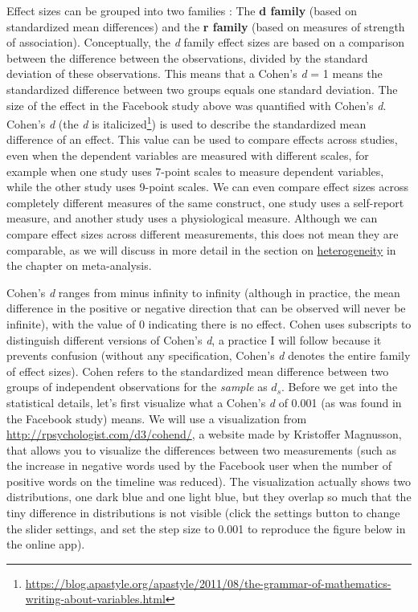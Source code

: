 \documentclass[
  oneside]{krantz}
\renewcommand{\href}[2]{#2\footnote{\url{#1}}}
\begin{document}
Effect sizes can be grouped into two families \citep{rosenthal_contrasts_2000}: The \textbf{d family} (based on standardized mean differences) and the \textbf{r family} (based on measures of strength of association). Conceptually, the \emph{d} family effect sizes are based on a comparison between the difference between the observations, divided by the standard deviation of these observations. This means that a Cohen's \emph{d} = 1 means the standardized difference between two groups equals one standard deviation. The size of the effect in the Facebook study above was quantified with Cohen's \emph{d}. Cohen's \emph{d} (the \emph{d} is \href{https://blog.apastyle.org/apastyle/2011/08/the-grammar-of-mathematics-writing-about-variables.html}{italicized}) is used to describe the standardized mean difference of an effect. This value can be used to compare effects across studies, even when the dependent variables are measured with different scales, for example when one study uses 7-point scales to measure dependent variables, while the other study uses 9-point scales. We can even compare effect sizes across completely different measures of the same construct, one study uses a self-report measure, and another study uses a physiological measure. Although we can compare effect sizes across different measurements, this does not mean they are comparable, as we will discuss in more detail in the section on \protect\hyperlink{heterogeneity}{heterogeneity} in the chapter on meta-analysis.

Cohen's \emph{d} ranges from minus infinity to infinity (although in practice, the mean difference in the positive or negative direction that can be observed will never be infinite), with the value of 0 indicating there is no effect. Cohen \citeyearpar{cohen_statistical_1988} uses subscripts to distinguish different versions of Cohen's \emph{d}, a practice I will follow because it prevents confusion (without any specification, Cohen's \emph{d} denotes the entire family of effect sizes). Cohen refers to the standardized mean difference between two groups of independent observations for the \emph{sample} as \(d_s\). Before we get into the statistical details, let's first visualize what a Cohen's \emph{d} of 0.001 (as was found in the Facebook study) means. We will use a visualization from \url{http://rpsychologist.com/d3/cohend/}, a website made by Kristoffer Magnusson, that allows you to visualize the differences between two measurements (such as the increase in negative words used by the Facebook user when the number of positive words on the timeline was reduced). The visualization actually shows two distributions, one dark blue and one light blue, but they overlap so much that the tiny difference in distributions is not visible (click the settings button to change the slider settings, and set the step size to 0.001 to reproduce the figure below in the online app).
\end{document}

